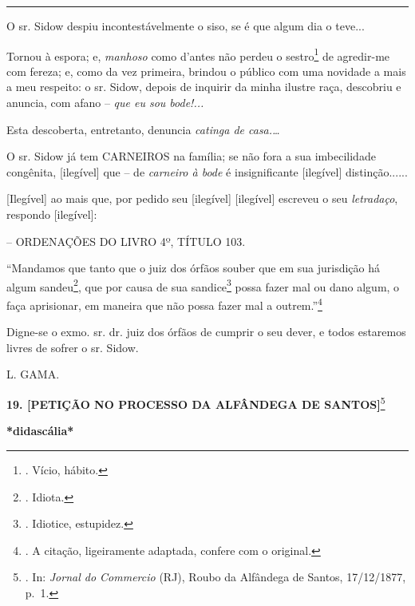 \begin{center}\rule{0.5\linewidth}{\linethickness}\end{center}

O sr. Sidow despiu incontestávelmente o siso, se é que algum dia o
teve...

Tornou à espora; e, \emph{manhoso} como d'antes não perdeu o
sestro\footnote{. Vício, hábito.} de agredir-me com fereza; e, como da
vez primeira, brindou o público com uma novidade a mais a meu respeito:
o sr. Sidow, depois de inquirir da minha ilustre raça, descobriu e
anuncia, com afano -- \emph{que eu sou bode!...}

Esta descoberta, entretanto, denuncia \emph{catinga de casa.\ldots{}}

O sr. Sidow já tem CARNEIROS na família; se não fora a sua imbecilidade
congênita, {[}ilegível{]} que -- de \emph{carneiro à bode} é
insignificante {[}ilegível{]} distinção......

{[}Ilegível{]} ao mais que, por pedido seu {[}ilegível{]} {[}ilegível{]}
escreveu o seu \emph{letradaço}, respondo {[}ilegível{]}:

-- ORDENAÇÕES DO LIVRO 4º, TÍTULO 103.

``Mandamos que tanto que o juiz dos órfãos souber que em sua jurisdição
há algum sandeu\footnote{. Idiota.}, que por causa de sua
sandice\footnote{. Idiotice, estupidez.} possa fazer mal ou dano algum,
o faça aprisionar, em maneira que não possa fazer mal a
outrem.''\footnote{. A citação, ligeiramente adaptada, confere com o
  original.}

Digne-se o exmo. sr. dr. juiz dos órfãos de cumprir o seu dever, e todos
estaremos livres de sofrer o sr. Sidow.

L. GAMA.

\textbf{19. {[}PETIÇÃO NO PROCESSO DA ALFÂNDEGA DE SANTOS{]}}\footnote{.
  In: \emph{Jornal do Commercio} (RJ), Roubo da Alfândega de Santos,
  17/12/1877, p.~1.}

\textbf{*didascália*}


